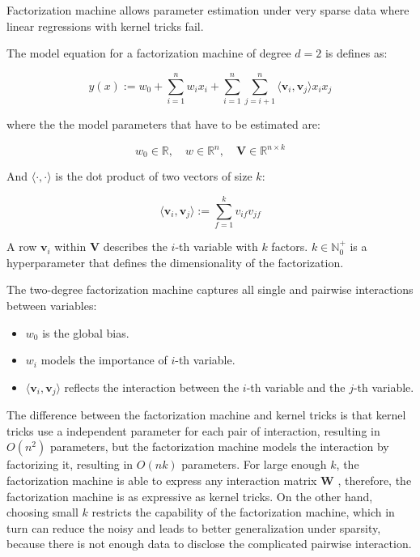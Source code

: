         Factorization machine allows parameter estimation under very sparse data
        where linear regressions with kernel tricks fail. \cite{Rendle2010}

        The model equation for a factorization machine of degree $d=2$ is defines as:

        \begin{equation}
        y(x) := w_0 + \sum_{i=1}^n w_i x_i + \sum_{i=1}^n\sum_{j=i+1}^n \langle \bm{v}_i, \bm{v}_j \rangle x_ix_j
        \label{eq:fm}
        \end{equation}

        where the the model parameters that have to be estimated are:

        \[
        w_0 \in \mathbb{R}, \quad w \in \mathbb{R}^n, \quad \bm{V} \in \mathbb{R}^{n \times k}
        \]

        And $\langle \cdot, \cdot \rangle$ is the dot product of two vectors of size $k$:

        \[
        \langle \bm{v}_i, \bm{v}_j \rangle := \sum_{f=1}^k v_{if}v_{jf}
        \]

        A row $\bm{v}_i$ within $\bm{V}$ describes the $i$-th variable with $k$ factors.
        $k \in \mathbb{N}_0^+$ is a hyperparameter that defines the dimensionality of the factorization.

        The two-degree factorization machine captures all single and pairwise interactions between variables:

        \begin{itemize}
            \item $w_0$ is the global bias.
            \item $w_i$ models the importance of $i$-th variable.
            \item $\langle \bm{v}_i, \bm{v}_j \rangle$ reflects the interaction
                between the $i$-th variable and the $j$-th variable.
        \end{itemize}

        The difference between the factorization machine and kernel tricks is that
        kernel tricks use a independent parameter for each pair of interaction, resulting in $O(n^2)$ parameters,
        but the factorization machine models the interaction by factorizing it, resulting in $O(nk)$ parameters.
        For large enough $k$, the factorization machine is able to express any interaction matrix $\bm{W}$ \cite{Rendle2010},
        therefore, the factorization machine is as expressive as kernel tricks.
        On the other hand, choosing small $k$ restricts the capability of the factorization machine,
        which in turn can reduce the noisy and leads to better generalization under sparsity,
        because there is not enough data to disclose the complicated pairwise interaction.

